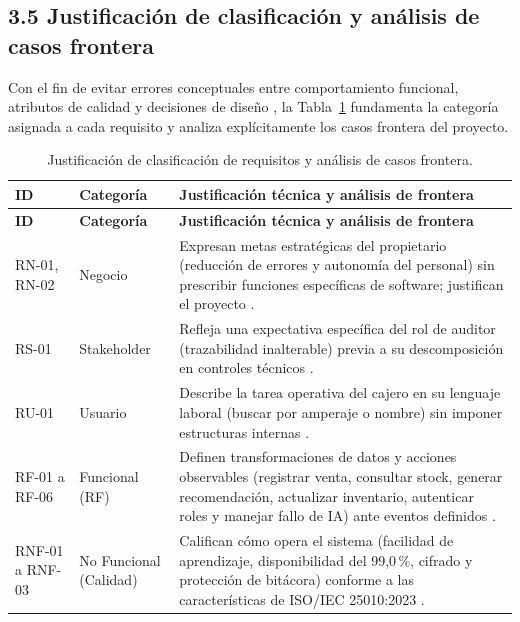\documentclass[onecolumn,12pt]{IEEEtran}
\begin{document}
	\subsection{3.5 Justificaci\'on de clasificaci\'on y an\'alisis de casos frontera}
	
	Con el fin de evitar errores conceptuales entre comportamiento funcional, atributos de calidad y decisiones de dise\~no \cite{pohl2025,glinz2007}, la Tabla~\ref{tab:justif_clasif} fundamenta la categor\'ia asignada a cada requisito y analiza expl\'icitamente los casos frontera del proyecto.
	
	\begin{longtable}{>{\raggedright\arraybackslash}p{1.4cm} >{\raggedright\arraybackslash}p{2.4cm} >{\raggedright\arraybackslash}p{11.2cm}}
		\caption{Justificaci\'on de clasificaci\'on de requisitos y an\'alisis de casos frontera.}
		\label{tab:justif_clasif}\\
		\toprule
		\textbf{ID} & \textbf{Categor\'ia} & \textbf{Justificaci\'on t\'ecnica y an\'alisis de frontera} \\
		\midrule
		\endfirsthead
		\toprule
		\textbf{ID} & \textbf{Categor\'ia} & \textbf{Justificaci\'on t\'ecnica y an\'alisis de frontera} \\
		\midrule
		\endhead
		\bottomrule
		\endfoot
		RN-01, RN-02 & Negocio & Expresan metas estrat\'egicas del propietario (reducci\'on de errores y autonom\'ia del personal) sin prescribir funciones espec\'ificas de software; justifican el proyecto \cite{iso29148,wiegers2013}. \\
		\midrule
		RS-01 & Stakeholder & Refleja una expectativa espec\'ifica del rol de auditor (trazabilidad inalterable) previa a su descomposici\'on en controles t\'ecnicos \cite{iso29148,pmbok7}. \\
		\midrule
		RU-01 & Usuario & Describe la tarea operativa del cajero en su lenguaje laboral (buscar por amperaje o nombre) sin imponer estructuras internas \cite{iso29148,ireb2023}. \\
		\midrule
		RF-01 a RF-06 & Funcional (RF) & Definen transformaciones de datos y acciones observables (registrar venta, consultar stock, generar recomendaci\'on, actualizar inventario, autenticar roles y manejar fallo de IA) ante eventos definidos \cite{iso29148,pohl2025}. \\
		\midrule
		RNF-01 a RNF-03 & No Funcional (Calidad) & Califican c\'omo opera el sistema (facilidad de aprendizaje, disponibilidad del 99,0\,\%, cifrado y protecci\'on de bit\'acora) conforme a las caracter\'isticas de ISO/IEC 25010:2023 \cite{iso25010,glinz2007}. \\

\end{longtable}
\end{document}
